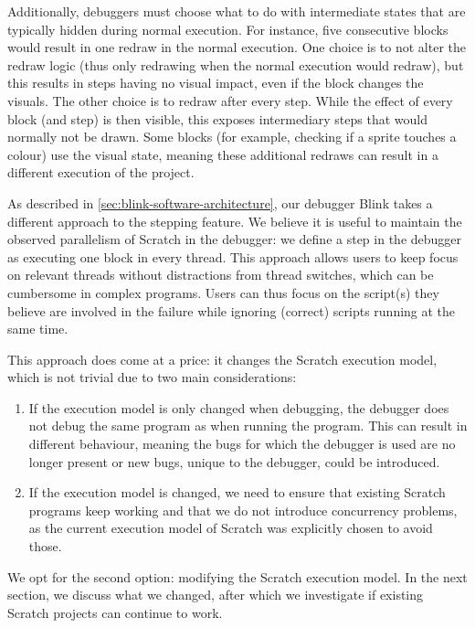\documentclass[../main]{subfiles}
\begin{document}
Additionally, debuggers must choose what to do with intermediate states that are typically hidden during normal execution.
For instance, five consecutive blocks would result in one redraw in the normal execution.
One choice is to not alter the redraw logic (thus only redrawing when the normal execution would redraw), but this results in steps having no visual impact, even if the block changes the visuals.
The other choice is to redraw after every step.
While the effect of every block (and step) is then visible, this exposes intermediary steps that would normally not be drawn.
Some blocks (for example, checking if a sprite touches a colour) use the visual state, meaning these additional redraws can result in a different execution of the project.

As described in \cref{sec:blink-software-architecture}, our debugger Blink takes a different approach to the stepping feature.
We believe it is useful to maintain the observed parallelism of Scratch in the debugger: we define a step in the debugger as executing one block in every thread.
This approach allows users to keep focus on relevant threads without distractions from thread switches, which can be cumbersome in complex programs.
Users can thus focus on the script(s) they believe are involved in the failure while ignoring (correct) scripts running at the same time.

This approach does come at a price: it changes the Scratch execution model, which is not trivial due to two main considerations:

\begin{enumerate}
    \item If the execution model is only changed when debugging, the debugger does not debug the same program as when running the program.
        This can result in different behaviour, meaning the bugs for which the debugger is used are no longer present or new bugs, unique to the debugger, could be introduced.
    \item If the execution model is changed, we need to ensure that existing Scratch programs keep working and that we do not introduce concurrency problems, as the current execution model of Scratch was explicitly chosen to avoid those.
\end{enumerate}

We opt for the second option: modifying the Scratch execution model.
In the next section, we discuss what we changed, after which we investigate if existing Scratch projects can continue to work.
\end{document}
